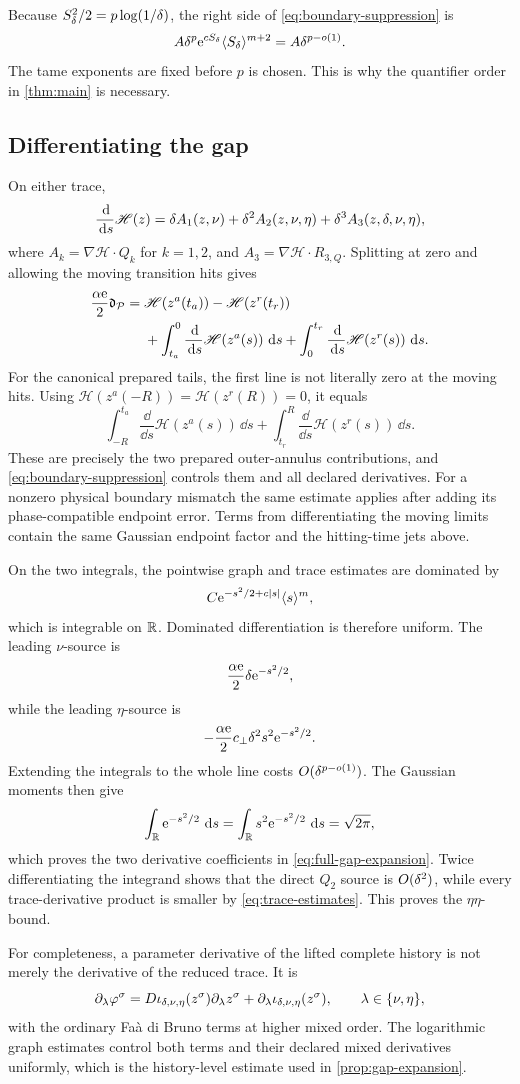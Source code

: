Because \(S_\delta^2/2=p\log(1/\delta)\), the right side of
\cref{eq:boundary-suppression} is
\[
 A\delta^p\mathrm e^{cS_\delta}\langle S_\delta\rangle^{m+2}
 =A\delta^{p-o(1)}.
\]
The tame exponents are fixed before \(p\) is chosen.  This is why the
quantifier order in \cref{thm:main} is necessary.

\subsection{Differentiating the gap}

On either trace,
\[
 \frac{\,\mathrm d}{\,\mathrm d s}\mathscr H(z)
 =\delta A_1(z,\nu)+\delta^2A_2(z,\nu,\eta)
  +\delta^3A_3(z,\delta,\nu,\eta),
\]
where \(A_k=\nabla\mathscr H\cdot Q_k\) for \(k=1,2\), and
\(A_3=\nabla\mathscr H\cdot R_{3,Q}\).  Splitting at zero and allowing
the moving transition hits gives
\begin{align}
 \frac{\alpha\mathrm e}{2}\mathfrak d_\mathcal P
 ={}&\mathscr H(z^a(t_a))-\mathscr H(z^r(t_r))\notag\\
 &+\int_{t_a}^{0}\frac{\,\mathrm d}{\,\mathrm d s}\mathscr H(z^a(s))\,\,\mathrm d s
  +\int_{0}^{t_r}\frac{\,\mathrm d}{\,\mathrm d s}\mathscr H(z^r(s))\,\,\mathrm d s.
 \label{eq:moving-gap-identity}
\end{align}
For the canonical prepared tails, the first line is not literally zero at
the moving hits.  Using \(\mathscr H(z^a(-R))=
\mathscr H(z^r(R))=0\), it equals
\[
 \int_{-R}^{t_a}\frac{\dd}{\dd s}\mathscr H(z^a(s))\,\dd s
 +\int_{t_r}^{R}\frac{\dd}{\dd s}\mathscr H(z^r(s))\,\dd s.
\]
These are precisely the two prepared outer-annulus contributions, and
\cref{eq:boundary-suppression} controls them and all declared derivatives.
For a nonzero physical boundary mismatch the same estimate applies after
adding its phase-compatible endpoint error.  Terms from differentiating the
moving limits contain the same Gaussian endpoint factor and the hitting-time
jets above.

On the two integrals, the pointwise graph and trace estimates are dominated
by
\[
 C\mathrm e^{-s^2/2+c|s|}\langle s\rangle^m,
\]
which is integrable on \(\mathbb R\).  Dominated differentiation is therefore
uniform.  The leading \(\nu\)-source is
\[
 \frac{\alpha\mathrm e}{2}\delta\mathrm e^{-s^2/2},
\]
while the leading \(\eta\)-source is
\[
 -\frac{\alpha\mathrm e}{2}c_\perp\delta^2s^2\mathrm e^{-s^2/2}.
\]
Extending the integrals to the whole line costs
\(O(\delta^{p-o(1)})\).  The Gaussian moments then give
\[
 \int_\mathbb R\mathrm e^{-s^2/2}\,\,\mathrm d s
 =\int_\mathbb R s^2\mathrm e^{-s^2/2}\,\,\mathrm d s=\sqrt{2\pi},
\]
which proves the two derivative coefficients in
\cref{eq:full-gap-expansion}.  Twice differentiating the integrand shows
that the direct \(Q_2\) source is \(O(\delta^2)\), while every trace-derivative
product is smaller by \cref{eq:trace-estimates}.  This proves the
\(\eta\eta\)-bound.

For completeness, a parameter derivative of the lifted complete history is
not merely the derivative of the reduced trace.  It is
\[
 \partial_\lambda\varphi^\sigma
 =D\iota_{\delta,\nu,\eta}(z^\sigma)
     \partial_\lambda z^\sigma
  +\partial_\lambda\iota_{\delta,\nu,\eta}(z^\sigma),
 \qquad \lambda\in\{\nu,\eta\},
\]
with the ordinary Faà di Bruno terms at higher mixed order.  The
logarithmic graph estimates control both terms and their declared mixed
derivatives uniformly, which is the history-level estimate used in
\cref{prop:gap-expansion}.
